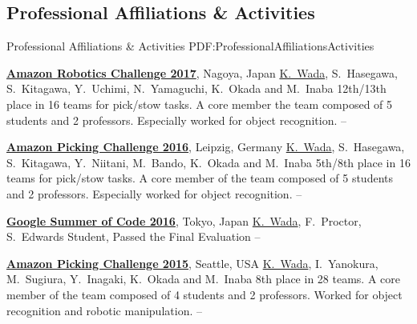 \documentclass[letterpaper,MMMyyyy,nonstop]{simpleresumecv}
\begin{document}
\begin{body}

\section
{Professional Affiliations\newline
\& Activities}
{Professional Affiliations \& Activities}
{PDF:ProfessionalAffiliationsActivities}

\href{https://www.amazonrobotics.com/#/roboticschallenge}
{\textbf{Amazon Robotics Challenge 2017}},
Nagoya, Japan
\GapNoBreak
\BulletItem
\underline{K.~Wada}, S.~Hasegawa, S.~Kitagawa, Y.~Uchimi, N.~Yamaguchi, K.~Okada and M.~Inaba
\BulletItem
12th/13th place in 16 teams for pick/stow tasks.
\BulletItem
A core member the team composed of 5 students and 2 professors.
\BulletItem
Especially worked for object recognition.
\hfill
{} --

\href{https://www.amazonrobotics.com/#/pickingchallenge}
{\textbf{Amazon Picking Challenge 2016}},
Leipzig, Germany
\GapNoBreak
\BulletItem
\underline{K.~Wada}, S.~Hasegawa, S.~Kitagawa, Y.~Niitani, M.~Bando, K.~Okada and M.~Inaba
\BulletItem
5th/8th place in 16 teams for pick/stow tasks.
\BulletItem
A core member of the team composed of 5 students and 2 professors.
\BulletItem
Especially worked for object recognition.
\hfill
{} --

\href{https://summerofcode.withgoogle.com/archive/2016/projects/4547228978905088/}
{\textbf{Google Summer of Code 2016}},
Tokyo, Japan
\GapNoBreak
\BulletItem
\underline{K.~Wada}, F.~Proctor, S.~Edwards
\BulletItem
Student, Passed the Final Evaluation
\hfill
{} --

\href{https://www.amazonrobotics.com/#/pickingchallenge}
{\textbf{Amazon Picking Challenge 2015}},
Seattle, USA
\GapNoBreak
\BulletItem
\underline{K.~Wada}, I.~Yanokura, M.~Sugiura, Y.~Inagaki, K.~Okada and M.~Inaba
\BulletItem
8th place in 28 teams.
\BulletItem
A core member of the team composed of 4 students and 2 professors.
\BulletItem
Worked for object recognition and robotic manipulation.
\hfill
{} --



\end{body}
\end{document}

